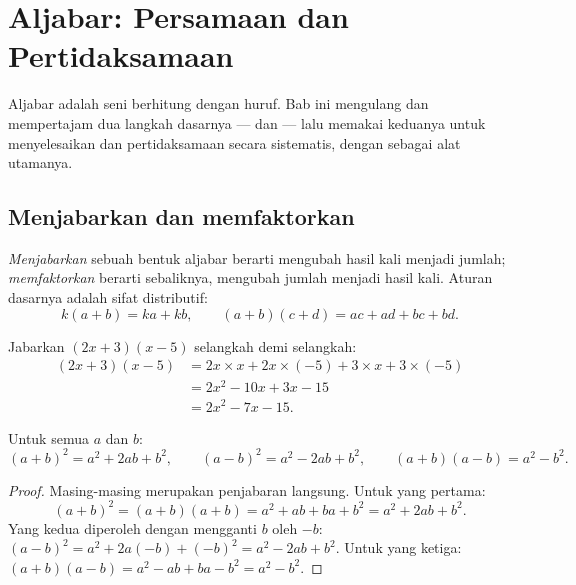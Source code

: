 \chapter{Aljabar: Persamaan dan Pertidaksamaan}\label{ch:g10:algebra}

Aljabar adalah seni berhitung dengan huruf. Bab ini mengulang dan
mempertajam dua langkah dasarnya ---  dan  --- lalu
memakai keduanya untuk menyelesaikan  dan pertidaksamaan secara
sistematis, dengan  sebagai alat utamanya.

\section{Menjabarkan dan memfaktorkan}

\begin{definition}\label{def:g10:algebra:expand}
\emph{Menjabarkan} sebuah bentuk aljabar berarti mengubah
hasil kali menjadi jumlah; \emph{memfaktorkan} berarti
sebaliknya, mengubah jumlah menjadi hasil kali. Aturan dasarnya adalah sifat
distributif:
\[
k(a + b) = ka + kb,
\qquad
(a + b)(c + d) = ac + ad + bc + bd .
\]
\end{definition}

\begin{example}\label{ex:g10:algebra:expand}
Jabarkan $(2x + 3)(x - 5)$ selangkah demi selangkah:
\begin{align*}
(2x + 3)(x - 5)
&= 2x \times x + 2x \times (-5) + 3 \times x + 3 \times (-5) \\
&= 2x^2 - 10x + 3x - 15 \\
&= 2x^2 - 7x - 15 .
\end{align*}
\end{example}

\begin{theorem}\label{thm:g10:algebra:identities}
Untuk semua  $a$ dan $b$:
\[
(a+b)^2 = a^2 + 2ab + b^2,
\qquad
(a-b)^2 = a^2 - 2ab + b^2,
\qquad
(a+b)(a-b) = a^2 - b^2 .
\]
\end{theorem}

\begin{proof}
Masing-masing merupakan penjabaran langsung. Untuk yang pertama:
\[
(a+b)^2 = (a+b)(a+b) = a^2 + ab + ba + b^2 = a^2 + 2ab + b^2 .
\]
Yang kedua diperoleh dengan mengganti $b$ oleh $-b$: $(a-b)^2 = a^2 + 2a(-b) +
(-b)^2 = a^2 - 2ab + b^2$. Untuk yang ketiga:
$(a+b)(a-b) = a^2 - ab + ba - b^2 = a^2 - b^2$.
\end{proof}

